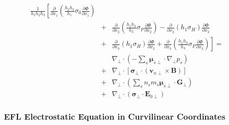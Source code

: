 \documentclass[11pt,letterpaper]{article}
\begin{document}
\begin{eqnarray}
\frac{1}{h_1 h_2 h_3} \left[ \frac{\partial}{\partial x_1} \left( \frac{h_2 h_3}{h_1} \sigma_0 \frac{\partial \Phi}{\partial x_1} \right) \right. && \nonumber \\
&+& \frac{\partial}{\partial x_2} \left( \frac{h_1 h_3}{h_2} \sigma_P \frac{\partial \Phi}{\partial x_2} \right) -  \frac{\partial}{\partial x_2} \left( h_1 \sigma_H \right) \frac{\partial \Phi}{\partial x_3}  \nonumber \\ 
&+& \left. \frac{\partial}{\partial x_3} \left( h_1 \sigma_H \right) \frac{\partial \Phi}{\partial x_2} + \frac{\partial}{\partial x_3} \left( \frac{h_1 h_2}{h_3} \sigma_P \frac{\partial \Phi}{\partial x_3} \right) \right]  = \nonumber \\
& & \nabla_\perp \cdot \left(  - \sum_s \boldsymbol{\mu}_{s\perp} \cdot \nabla_\perp p_s \right) \nonumber \\
&+&\nabla_\perp \cdot \left[ \boldsymbol{\sigma}_\perp \cdot \left( \mathbf{v}_{n\perp} \times \mathbf{B} \right) \right] \nonumber \\
&+& \nabla_\perp \cdot \left(  \sum_s n_s m_s  \boldsymbol{\mu}_{s\perp} \cdot \mathbf{G}_\perp \right)  \nonumber \\
&+& \nabla_\perp \cdot \left( \boldsymbol{\sigma}_\perp \cdot \mathbf{E}_{0\perp} \right) \label{eqn:curvpot}
\end{eqnarray}


\subsubsection{EFL Electrostatic Equation in Curvilinear Coordinates}
\end{document}

